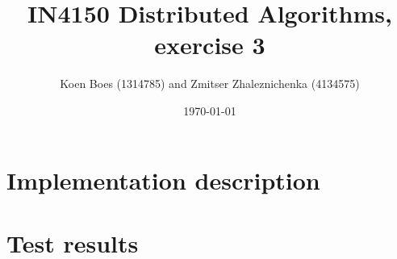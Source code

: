 \documentclass[a4paper, notitlepage]{article}
\begin{document}
\title{IN4150 Distributed Algorithms, exercise 3}
\author{Koen Boes (1314785) and Zmitser Zhaleznichenka (4134575)}
\date{\today}
\maketitle

\section{Implementation description}

\section{Test results}
\end{document}
